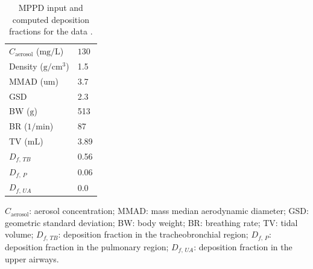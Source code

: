 \documentclass[preprint,12pt,authoryear]{elsarticle}
\begin{document}
\begin{table}[H]
\centering
\caption{MPPD input and computed deposition fractions for the \citet{gustafsson_2022} data \label{Table:MPPD_Gustafsson}.}
\begin{tabular}{ll}
\toprule
$C_{\text{aerosol}}$ ($\text{mg}/\text{L}$)  & $130$ \\
Density ($\text{g}/\text{cm}^3$) & 1.5  \\
MMAD ($\text{um}$)  & 3.7\\
GSD & 2.3\\
BW ($\text{g}$) & 513  \\
BR ($1/\text{min}$) & 87 \\
TV ($\text{mL}$)& 3.89 \\
$D_{f, \,TB}$& 0.56  \\
$D_{f, \,P}$  & 0.06 \\
$D_{f, \,UA}$ & 0.0 \\
\bottomrule
\end{tabular}

\vspace{0.5em}
\raggedright
\scriptsize
$C_{\text{aerosol}}$: aerosol concentration; 
MMAD: mass median aerodynamic diameter; 
GSD: geometric standard deviation; 
BW: body weight; 
BR: breathing rate; 
TV: tidal volume; 
$D_{f, \,TB}$: deposition fraction in the tracheobronchial region; 
$D_{f, \,P}$: deposition fraction in the pulmonary region; 
$D_{f, \,UA}$: deposition fraction in the upper airways.
\end{table}
\end{document}
